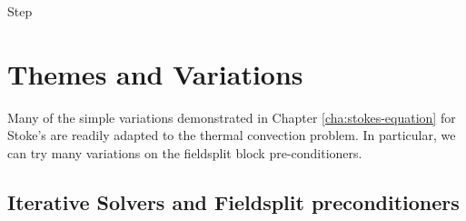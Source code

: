 \begin{steps}{Step}
\end{steps}


\section{Themes and Variations}
\label{sec:themes-variations}

Many of the simple variations demonstrated in Chapter
\ref{cha:stokes-equation} for Stoke's  are readily adapted
to the thermal convection problem.  In particular, we can try many
variations on the fieldsplit block pre-conditioners.

\subsection{Iterative Solvers and Fieldsplit preconditioners}
\label{sec:iterative-solvers-1}

